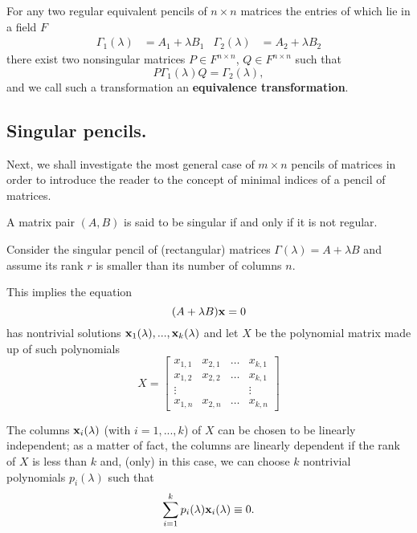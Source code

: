 \begin{lemma} \cite[Equation 2.14]{ikramov}
    For any two regular equivalent pencils of \(n \times n\) matrices the entries of which lie in a field \(F\)
    \begin{align*}
        \Gamma_{1}(\lambda) &= A_{1} + \lambda B_{1} &
        \Gamma_{2}(\lambda) &= A_{2} + \lambda B_{2}
    \end{align*}
    there exist two nonsingular matrices \(P \in F^{n \times n}\), \(Q \in F^{n \times n}\) such that
    \[
        P \Gamma_{1}(\lambda) Q = \Gamma_{2}(\lambda),
    \]
    and we call such a transformation an \textbf{equivalence transformation}.
\end{lemma}

\subsection*{Singular pencils.}
Next, we shall investigate the most general case of \(m \times n\) pencils of matrices in order to introduce
the reader to the concept of minimal indices of a pencil of matrices.
\begin{definition}\cite[p. 25, Definition 2]{gantmacher}
    A matrix pair \((A, B)\) is said to be singular if and only if it is not regular.
\end{definition}

Consider the singular pencil of (rectangular) matrices \(\Gamma(\lambda) = A + \lambda B\) and assume its rank \(r\) is smaller
than its number of columns \(n\).

This implies the equation
\[
    (A + \lambda B) \vb{x} = 0
\]
has nontrivial solutions \(\vb{x}_{1}(\lambda), ..., \vb{x}_{k}(\lambda)\) and let \(X\) be the polynomial
matrix made up of such polynomials
\[
    X =
    \begin{bmatrix}
        x_{1, 1} & x_{2, 1} & \ldots & x_{k, 1} \\
        x_{1, 2} & x_{2, 2} & \ldots & x_{k, 1} \\
        \vdots   &          &        &   \vdots \\
        x_{1, n} & x_{2, n} & \ldots & x_{k, n}
    \end{bmatrix}
\]

The columns \(\vb{x}_{i}(\lambda)\) (with \(i = 1, ..., k\)) of \(X\) can be chosen to be linearly independent; as a matter of
fact, the columns are linearly dependent if the rank of \(X\) is less than \(k\) and, (only) in this case, we can
choose \(k\) nontrivial polynomials \(p_{i}(\lambda)\) such that
\[
    \sum_{i=1}^{k} p_{i}(\lambda) \vb{x}_{i}(\lambda) \equiv 0.
\]

